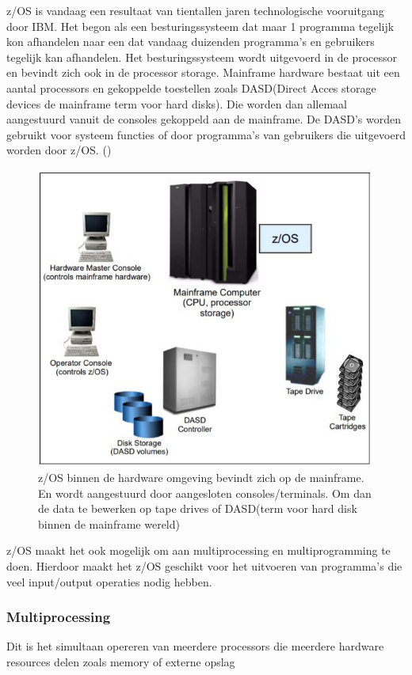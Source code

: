 z/OS is vandaag een resultaat van tientallen jaren technologische vooruitgang door IBM. Het begon als een besturingssysteem dat maar 1 programma tegelijk kon afhandelen naar een dat vandaag duizenden programma's en gebruikers tegelijk kan afhandelen. Het besturingssysteem wordt uitgevoerd in de processor en bevindt zich ook in de processor storage. Mainframe hardware bestaat uit een aantal processors en gekoppelde toestellen zoals DASD(Direct Acces storage devices de mainframe term voor hard disks). Die worden dan allemaal aangestuurd vanuit de consoles gekoppeld aan de mainframe. De DASD's worden gebruikt voor systeem functies of door programma's van gebruikers die uitgevoerd worden door z/OS. (\cite{Ebbers2011})

\begin{figure}[h]
	\centering
	\includegraphics{img/Omgeving_zOS}
	\caption[z/OS binnen de mainframe omgeving]{z/OS binnen de hardware omgeving bevindt zich op de mainframe. En wordt aangestuurd door aangesloten consoles/terminals. Om dan de data te bewerken op tape drives of DASD(term voor hard disk binnen de mainframe wereld)\cite{Ebbers2011}}
	\label{fig:omgevingzos}
\end{figure}

z/OS maakt het ook mogelijk om aan multiprocessing en multiprogramming te doen. Hierdoor maakt het z/OS geschikt voor het uitvoeren van programma's die veel input/output operaties nodig hebben. 

\subsubsection{Multiprocessing}
\label{subsubsec:Multiprocessing}
Dit is het simultaan opereren van meerdere processors die meerdere hardware resources delen zoals memory of externe opslag

